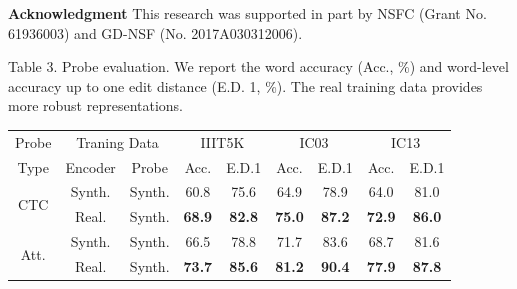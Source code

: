 \documentclass{article}
\begin{document}
\begin{multicols}{2}
            \newline
            \newline
            
    \textbf{Acknowledgment}\newline
        This research was supported in part by NSFC (Grant No.
        61936003) and GD-NSF (No. 2017A030312006).
    
     

\end{multicols}



\begin{table} [t]

    \captionsetup{justification=centering}
    \captionabove
    {
        Table 3. Probe evaluation. We report the word accuracy (Acc., \%)
        and word-level accuracy up to one edit distance (E.D. 1, \%). The
        real training data provides more robust representations.
    }
    \begin{center}
    \begin{tabular}{ c c c c c c c c c} 
     \hline
     Probe &  \multicolumn{2}{c}{Traning Data} &  \multicolumn{2}{c}{IIIT5K} &  \multicolumn{2}{c}{IC03} & \multicolumn{2}{c}{IC13} \\ 
     \cline{2-3}   \cline{4-5}  \cline{6-7} \cline{8-9}
    Type & Encoder & Probe & Acc. & E.D.1 & Acc. & E.D.1 & Acc. & E.D.1\\ 
    \hline
    \multirow{2}{*}{CTC} & Synth. & Synth. & 60.8 & 75.6 & 64.9 & 78.9 & 64.0 & 81.0\\
    & Real. & Synth. & \textbf{68.9} & \textbf{82.8} & \textbf{75.0} & \textbf{87.2} & \textbf{72.9} & \textbf{86.0}\\
    \hline
    \multirow{2}{*}{Att.} & Synth. & Synth. & 66.5 & 78.8 & 71.7 & 83.6 & 68.7 & 81.6\\
    & Real. & Synth. & \textbf{73.7} & \textbf{85.6} & \textbf{81.2} & \textbf{90.4} & \textbf{77.9} & \textbf{87.8}\\
    \hline
    \end{tabular}
    \end{center}
     
    \label{tab:my_label2}
    
\end{table}
\end{document}
